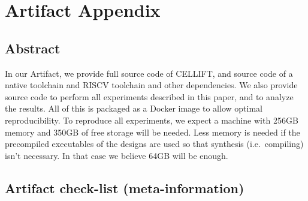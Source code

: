 \documentclass[letterpaper,twocolumn,10pt]{article}
\begin{document}


\newcommand{\ourname}{C{\smaller[1]ELL}IFT\xspace}

\appendix
\section{Artifact Appendix}

%

\subsection{Abstract}

In our Artifact, we provide full source code of \ourname, and source code
of a native toolchain and RISCV toolchain and other dependencies. We also
provide source code to perform all experiments described in this paper,
and to analyze the results. All of this is packaged as a Docker image to
allow optimal reproducibility. To reproduce all experiments, we expect
a machine with 256GB memory and 350GB of free storage will be needed. Less memory is needed if the
precompiled executables of the designs are used so that synthesis (i.e.\ compiling)
isn't necessary. In that case we believe 64GB will be enough.

\subsection{Artifact check-list (meta-information)}

\end{document}
